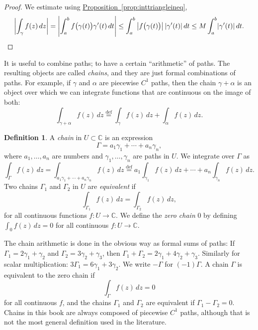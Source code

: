 \documentclass[12pt,openany]{book}
\newcommand{\sabs}[1]{\lvert {#1} \rvert}
\newcommand{\abs}[1]{\left\lvert {#1} \right\rvert}
\newcommand{\C}{{\mathbb{C}}}
\newcommand{\myindex}[1]{#1\index{#1}}
\theoremstyle{plain}
\theoremstyle{remark}
\theoremstyle{definition}
\newtheorem{defn}[thm]{Definition}
\theoremstyle{exercise}
\theoremstyle{example}
\newcommand{\propref}[1]{\hyperref[#1]{Proposition~\ref*{#1}}}
\begin{document}
\begin{proof}
We estimate using \propref{prop:inttriangleineq},
\begin{equation*}
\abs{\int_\gamma f(z) \, dz}
=
\abs{\int_a^b f\bigl( \gamma(t) \bigr) \gamma'(t) \, dt}
\leq
\int_a^b \abs{ f\bigl( \gamma(t) \bigr) }  \sabs{ \gamma'(t) } \, dt
\leq
M
\int_a^b \sabs{ \gamma'(t) } \, dt .
\qedhere
\end{equation*}
\end{proof}

It is useful to combine paths; to have a certain ``arithmetic'' of paths.
The resulting objects are called \emph{chains}, and they
are just formal combinations of paths.  For example, if $\gamma$
and $\alpha$ are piecewise $C^1$ paths, then the chain  $\gamma+\alpha$
is an object over which we can integrate functions that are continuous
on the image of both:
\begin{equation*}
\int_{\gamma + \alpha} f(z) \, dz
\overset{\text{def}}{=}
\int_{\gamma} f(z) \, dz +
\int_{\alpha} f(z) \, dz .
\end{equation*}

\begin{defn}
A \emph{\myindex{chain}} in $U \subset \C$ is an expression
\begin{equation*}
\Gamma = a_1 \gamma_1 + \cdots + a_n \gamma_n ,
\end{equation*}
where $a_1,\ldots,a_n$ are numbers and $\gamma_1,\ldots,\gamma_n$
are paths in $U$.  We integrate over $\Gamma$ as
\begin{equation*}
\int_{\Gamma} f(z) \, dz
=
\int_{a_1 \gamma_1 + \cdots + a_n \gamma_n} f(z) \, dz
\overset{\text{def}}{=}
a_1 \int_{\gamma_1} f(z) \, dz +
\cdots
+
a_n \int_{\gamma_n} f(z) \, dz .
\end{equation*}
Two chains $\Gamma_1$ and $\Gamma_2$ in 
$U$ are
\emph{equivalent} if
\begin{equation*}
\int_{\Gamma_1} f(z) \, dz = 
\int_{\Gamma_2} f(z) \, dz ,
\end{equation*}
for all continuous functions $f \colon U \to \C$.
We define the \emph{\myindex{zero chain}} $0$ by defining 
$\int_0 f(z) \, dz = 0$ for all continuous $f \colon U \to \C$.
\end{defn}

The chain arithmetic is done in the obvious way as formal sums of paths:
If $\Gamma_1 = 2 \gamma_1 + \gamma_2$ and $\Gamma_2 = 3 \gamma_2 +
\gamma_3$, then $\Gamma_1 + \Gamma_2 = 2 \gamma_1 + 4 \gamma_2 + \gamma_3$.
Similarly for scalar multiplication: $3 \Gamma_1 = 6 \gamma_1 + 3 \gamma_2$.
We write $-\Gamma$ for $(-1)\Gamma$.
A chain $\Gamma$ is equivalent to the zero chain if
\begin{equation*}
\int_\Gamma f(z)\, dz = 0
\end{equation*}
for all continuous $f$, and
the chains $\Gamma_1$ and $\Gamma_2$ are equivalent if $\Gamma_1 - \Gamma_2 = 0$.
Chains in this book are always composed of piecewise $C^1$ paths,
although that is not the most general definition used in the literature.
\end{document}
